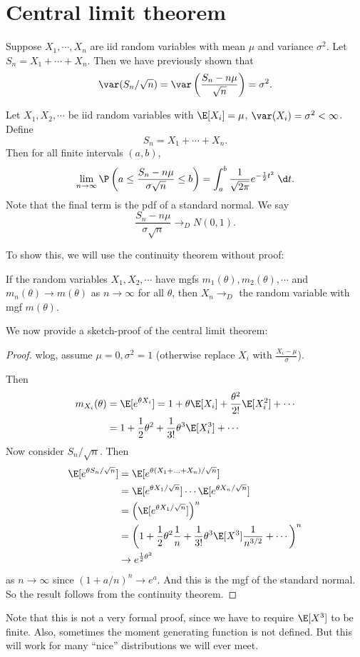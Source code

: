 \documentclass[a4paper]{article}
\begin{document}
\section{Central limit theorem}
Suppose $X_1, \cdots, X_n$ are iid random variables with mean $\mu$ and variance $\sigma^2$. Let $S_n = X_1 + \cdots + X_n$. Then we have previously shown that
\[
  \var(S_n/\sqrt{n}) = \var\left(\frac{S_n - n \mu}{\sqrt{n}}\right) = \sigma^2.
\]
\begin{thm}
  Let $X_1, X_2, \cdots$ be iid random variables with $\E[X_i] = \mu$, $\var(X_i) = \sigma^2 < \infty$. Define
  \[
    S_n = X_1 + \cdots + X_n.
  \]
  Then for all finite intervals $(a, b)$,
  \[
    \lim_{n \to \infty}\P\left(a \leq \frac{S_{n} - n\mu}{\sigma\sqrt{n}} \leq b\right) = \int_a^b \frac{1}{\sqrt{2\pi}} e^{-\frac{1}{2}t^2}\;\d t.
  \]
  Note that the final term is the pdf of a standard normal. We say
  \[
    \frac{S_n - n\mu}{\sigma\sqrt{n}} \to_{D} N(0, 1).
  \]
\end{thm}

To show this, we will use the continuity theorem without proof:
\begin{thm}
  If the random variables $X_1, X_2, \cdots$ have mgfs $m_1(\theta), m_2(\theta), \cdots$ and $m_n(\theta) \to m(\theta)$ as $n\to\infty$ for all $\theta$, then $X_n \to_D $ the random variable with mgf $m(\theta)$.
\end{thm}

We now provide a sketch-proof of the central limit theorem:
\begin{proof}
  wlog, assume $\mu = 0, \sigma^2 = 1$ (otherwise replace $X_i$ with $\frac{X_i - \mu}{\sigma}$).

  Then
  \begin{align*}
    m_{X_i}(\theta) &= \E[e^{\theta X_i}] = 1 + \theta \E[X_i] + \frac{\theta^2}{2!} \E[X_i^2] + \cdots\\
    &=1 + \frac{1}{2}\theta^2 + \frac{1}{3!}\theta^3 \E[X_i^3] + \cdots
  \end{align*}
  Now consider $S_n/\sqrt{n}$. Then
  \begin{align*}
    \E[e^{\theta S_n/\sqrt{n}}] &= \E[e^{\theta(X_1 + \ldots + X_n)/\sqrt{n}}]\\
    &= \E[e^{\theta X_1/\sqrt{n}}] \cdots \E[e^{\theta X_n/\sqrt{n}}]\\
    &= \left(\E[e^{\theta X_1/\sqrt{n}}]\right)^n\\
    &= \left(1 + \frac{1}{2}\theta^2 \frac{1}{n} + \frac{1}{3!}\theta^3 \E[X^3]\frac{1}{n^{3/2}} + \cdots\right)^{n}\\
    &\to e^{\frac{1}{2}\theta^2}
  \end{align*}
  as $n \to \infty$ since $(1 + a/n)^n \to e^a$. And this is the mgf of the standard normal. So the result follows from the continuity theorem.
\end{proof}
Note that this is not a very formal proof, since we have to require $\E[X^3]$ to be finite. Also, sometimes the moment generating function is not defined. But this will work for many ``nice'' distributions we will ever meet.
\end{document}
